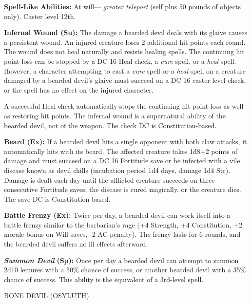 \documentclass{article}
\begin{document}
\textbf{Spell-Like Abilities: }At will--- \textit{greater teleport }(self plus 
50 pounds of objects only). Caster level 12th.

\textbf{Infernal Wound (Su):} The damage a bearded devil deals with its glaive 
causes a persistent wound. An injured creature loses 2 additional hit points each 
round. The wound does not heal naturally and resists healing spells. The continuing 
hit point loss can be stopped by a DC 16 Heal check, a \textit{cure }spell, or 
a \textit{heal }spell. However, a character attempting to cast a \textit{cure }spell 
or a \textit{heal }spell on a creature damaged by a bearded devil's glaive must 
succeed on a DC 16 caster level check, or the spell has no effect on the injured 
character.

A successful Heal check automatically stops the continuing hit point loss as well 
as restoring hit points. The infernal wound is a supernatural ability of the bearded 
devil, not of the weapon. The check DC is Constitution-based.

\textbf{Beard (Ex):} If a bearded devil hits a single opponent with both claw attacks, 
it automatically hits with its beard. The affected creature takes 1d8+2 points 
of damage and must succeed on a DC 16 Fortitude save or be infected with a vile 
disease known as devil chills (incubation period 1d4 days, damage 1d4 Str). Damage 
is dealt each day until the afflicted creature succeeds on three consecutive Fortitude 
saves, the disease is cured magically, or the creature dies. The save DC is Constitution-based.

\textbf{Battle Frenzy (Ex):} Twice per day, a bearded devil can work itself into 
a battle frenzy similar to the barbarian's rage (+4 Strength, +4 Constitution, 
+2 morale bonus on Will saves, -2 AC penalty). The frenzy lasts for 6 rounds, and 
the bearded devil suffers no ill effects afterward.

\textit{\textbf{Summon Devil }}\textbf{(Sp): }Once per day a bearded devil can 
attempt to summon 2d10 lemures with a 50\% chance of success, or another bearded 
devil with a 35\% chance of success. This ability is the equivalent of a 3rd-level 
spell.

\vspace{12pt}
BONE DEVIL (OSYLUTH)
\end{document}
